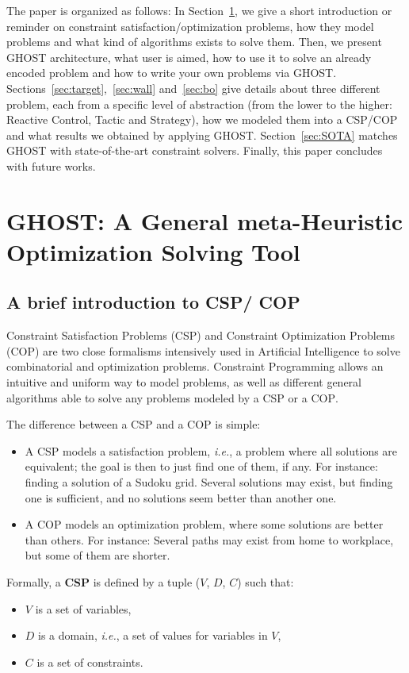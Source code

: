 \documentclass[journal]{IEEEtran}
\newcommand{\csp}{\textsc{CSP}\xspace}
\newcommand{\cop}{\textsc{COP}\xspace}
\newcommand{\ghost}{\textsc{GHOST}\xspace}
\newcommand{\ie}{\textit{i.e.}}
\begin{document}
The paper is organized as follows: In Section~\ref{sec:ghost}, we give
a     short     introduction     or     reminder     on     constraint
satisfaction/optimization problems,  how they model problems  and what
kind  of algorithms  exists to  solve them.   Then, we  present \ghost
architecture, what  user is aimed, how  to use it to  solve an already
encoded  problem  and how  to  write  your  own problems  via  \ghost.
Sections~\ref{sec:target},~\ref{sec:wall}     and~\ref{sec:bo}    give
details about three  different problem, each from a  specific level of
abstraction (from  the lower to  the higher: Reactive  Control, Tactic
and Strategy), how  we modeled them into a \csp/\cop  and what results
we obtained by applying  \ghost. Section~\ref{sec:SOTA} matches \ghost
with  state-of-the-art   constraint  solvers.   Finally,   this  paper
concludes with future works.

\section{\ghost:   A  General   meta-Heuristic  Optimization   Solving
  Tool}\label{sec:ghost}
\subsection{A brief introduction to \csp / \cop}

Constraint  Satisfaction Problems  (\csp) and  Constraint Optimization
Problems  (\cop)   are  two  close  formalisms   intensively  used  in
Artificial  Intelligence  to   solve  combinatorial  and  optimization
problems. Constraint  Programming allows an intuitive  and uniform way
to model  problems, as  well as different  general algorithms  able to
solve any problems modeled by a \csp or a \cop.

The difference between a \csp and a \cop is simple:
\begin{itemize}
\item A \csp  models a satisfaction problem, \ie, a  problem where all
  solutions are equivalent; the goal is then to just find one of them,
  if any. For  instance: finding a solution of a  Sudoku grid. Several
  solutions may exist, but finding one is sufficient, and no solutions
  seem better than another one.
\item A \cop models an  optimization problem, where some solutions are
  better than others.  For instance: Several paths may exist from home
  to workplace, but some of them are shorter.
\end{itemize}
Formally, a {\bf \csp} is defined by a tuple ($V$, $D$, $C$) such that:
\begin{itemize}
\item $V$ is a set of variables,
\item $D$ is a domain, \ie, a set of values for variables in $V$,
\item $C$ is a set of constraints.
\end{itemize}
\end{document}
